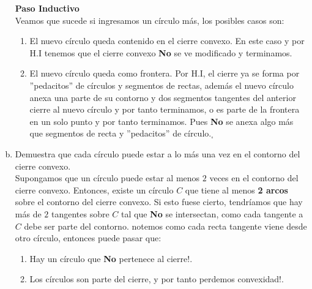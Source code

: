 \begin{enumerate}[a)]
\textbf{Paso Inductivo}\\
Veamos que sucede si ingresamos un círculo más, los posibles casos son:
\begin{enumerate}[1.]
    \item El nuevo círculo queda contenido en el cierre convexo. En este caso y por H.I tenemos que
    el cierre convexo \textbf{No} se ve modificado y terminamos.
    \item El nuevo círculo queda como frontera. Por H.I, el cierre ya se forma por ''pedacitos''
    de círculos y segmentos de rectas, además el nuevo círculo anexa una parte de su contorno
    y dos segmentos tangentes del anterior cierre al nuevo círculo y por tanto terminamos, o es
    parte de la frontera en un solo punto y por tanto terminamos. Pues \textbf{No} se anexa algo
    más que segmentos de recta y ''pedacitos'' de círculo.$_\square$
\end{enumerate}
\item Demuestra que cada círculo puede estar a lo más una vez en el contorno del cierre convexo.\\
Supongamos que un círculo puede estar al menos $2$ veces en el contorno del cierre convexo. Entonces,
existe un círculo $C$ que tiene al menos \textbf{2 arcos} sobre el contorno del cierre convexo.
Si esto fuese cierto, tendríamos que hay más de $2$ tangentes sobre $C$ tal que \textbf{No} se
intersectan, como cada tangente a $C$ debe ser parte del contorno.
notemos como cada recta tangente viene desde otro círculo, entonces puede pasar que:
\begin{enumerate}[1.]
    \item Hay un círculo que \textbf{No} pertenece al cierre$!$.
    \item Los círculos son parte del cierre, y por tanto perdemos convexidad$!$.
\end{enumerate}


\end{enumerate}
